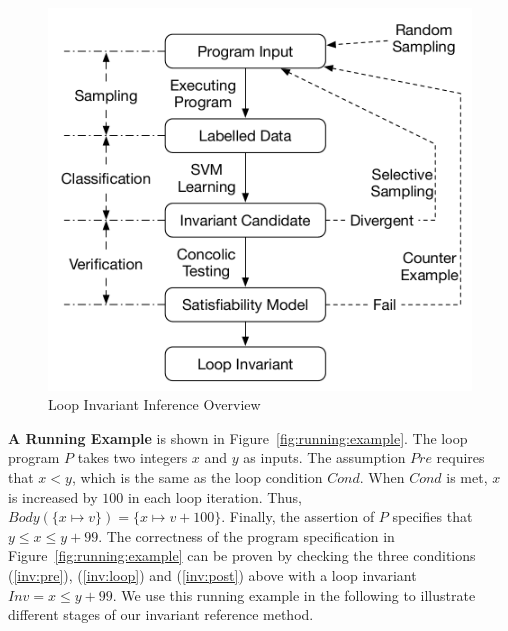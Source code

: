 
\begin{figure}[t]
    \centering
    \includegraphics[scale=0.45]{figures/overview.pdf}
    \caption{Loop Invariant Inference Overview}
    \label{fig:overview}
\end{figure}

\medskip\noindent
\textbf{A Running Example}
is shown in Figure~\ref{fig:running:example}. 
The loop program $P$ takes two integers $x$ and $y$ as inputs. 
The assumption $\mathit{Pre}$ requires that $x < y$, 
which is the same as the loop condition $\mathit{Cond}$. 
When $\mathit{Cond}$ is met, 
$x$ is increased by $100$ in each loop iteration. 
Thus, $\mathit{Body}(\{ x \mapsto v \}) = \{ x \mapsto v + 100 \}$. 
Finally, the assertion of $P$ specifies that $y \le x \le y + 99$. 
The correctness of the program specification in Figure~\ref{fig:running:example} 
can be proven by checking the three conditions 
(\ref{inv:pre}), (\ref{inv:loop}) and (\ref{inv:post}) above 
with a loop invariant $\mathit{Inv} = x \le y + 99$. 
We use this running example in the following 
to illustrate different stages of our invariant reference method. 

